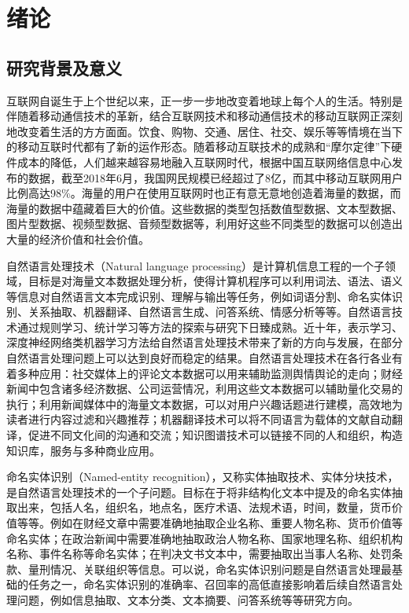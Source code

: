 \documentclass[winfonts,master,oneside,nobackinfo]{njuthesis}
\begin{document}
\chapter{绪论}\label{chapter_introduction}
\section{研究背景及意义}
互联网自诞生于上个世纪以来，正一步一步地改变着地球上每个人的生活。特别是伴随着移动通信技术的革新，结合互联网技术和移动通信技术的移动互联网正深刻地改变着生活的方方面面。饮食、购物、交通、居住、社交、娱乐等等情境在当下的移动互联时代都有了新的运作形态。随着移动互联技术的成熟和“摩尔定律”下硬件成本的降低，人们越来越容易地融入互联网时代，根据中国互联网络信息中心发布的数据，截至2018年6月，我国网民规模已经超过了8亿，而其中移动互联网用户比例高达98\%。海量的用户在使用互联网时也正有意无意地创造着海量的数据，而海量的数据中蕴藏着巨大的价值。这些数据的类型包括数值型数据、文本型数据、图片型数据、视频型数据、音频型数据等，利用好这些不同类型的数据可以创造出大量的经济价值和社会价值。

自然语言处理技术（Natural language processing）是计算机信息工程的一个子领域，目标是对海量文本数据处理分析，使得计算机程序可以利用词法、语法、语义等信息对自然语言文本完成识别、理解与输出等任务，例如词语分割、命名实体识别、关系抽取、机器翻译、自然语言生成、问答系统、情感分析等等。自然语言技术通过规则学习、统计学习等方法的探索与研究下日臻成熟。近十年，表示学习、深度神经网络类机器学习方法给自然语言处理技术带来了新的方向与发展，在部分自然语言处理问题上可以达到良好而稳定的结果。自然语言处理技术在各行各业有着多种应用：社交媒体上的评论文本数据可以用来辅助监测舆情舆论的走向；财经新闻中包含诸多经济数据、公司运营情况，利用这些文本数据可以辅助量化交易的执行；利用新闻媒体中的海量文本数据，可以对用户兴趣话题进行建模，高效地为读者进行内容过滤和兴趣推荐；机器翻译技术可以将不同语言为载体的文献自动翻译，促进不同文化间的沟通和交流；知识图谱技术可以链接不同的人和组织，构造知识库，服务与多种商业应用。

命名实体识别（Named-entity recognition），又称实体抽取技术、实体分块技术，是自然语言处理技术的一个子问题。目标在于将非结构化文本中提及的命名实体抽取出来，包括人名，组织名，地点名，医疗术语、法规术语，时间，数量，货币价值等等。例如在财经文章中需要准确地抽取企业名称、重要人物名称、货币价值等命名实体；在政治新闻中需要准确地抽取政治人物名称、国家地理名称、组织机构名称、事件名称等命名实体；在判决文书文本中，需要抽取出当事人名称、处罚条款、量刑情况、关联组织等信息。可以说，命名实体识别问题是自然语言处理最基础的任务之一，命名实体识别的准确率、召回率的高低直接影响着后续自然语言处理问题，例如信息抽取、文本分类、文本摘要、问答系统等等研究方向。
\end{document}
